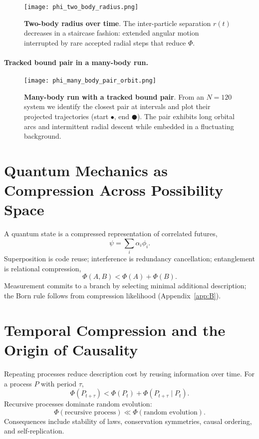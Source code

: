 \documentclass[aps,preprint,onecolumn,longbibliography,nofootinbib]{revtex4-2}
\numberwithin{equation}{section}        %
\begin{document}
\begin{figure}[H]
\centering
\texttt{[image: phi\_two\_body\_radius.png]}
\caption{\textbf{Two-body radius over time}. The inter-particle separation $r(t)$ decreases in a staircase fashion: extended angular motion interrupted by rare accepted radial steps that reduce $\Phi$.}
\label{fig:tworadius}
\end{figure}

\paragraph*{Tracked bound pair in a many-body run.}
\begin{figure}[H]
\centering
\texttt{[image: phi\_many\_body\_pair\_orbit.png]}
\caption{\textbf{Many-body run with a tracked bound pair}. From an $N{=}120$ system we identify the closest pair at intervals and plot their projected trajectories (start $\bullet$, end $\CIRCLE$). The pair exhibits long orbital arcs and intermittent radial descent while embedded in a fluctuating background.}
\label{fig:manypair}
\end{figure}

\section{Quantum Mechanics as Compression Across Possibility Space}
A quantum state is a compressed representation of correlated futures,
\begin{equation}
\psi = \sum_i \alpha_i \phi_i. \label{eq:super}
\end{equation}
Superposition is code reuse; interference is redundancy cancellation; entanglement is relational compression,
\begin{equation}
\Phi(A,B) < \Phi(A)+\Phi(B). \label{eq:ent}
\end{equation}
Measurement commits to a branch by selecting minimal additional description; the Born rule follows from compression likelihood (Appendix~\ref{app:B}).

\section{Temporal Compression and the Origin of Causality}
Repeating processes reduce description cost by reusing information over time. For a process $P$ with period $\tau$,
\begin{equation}
\Phi(P_{t+\tau}) < \Phi(P_t) + \Phi(P_{t+\tau}\mid P_t). \label{eq:loop}
\end{equation}
Recursive processes dominate random evolution:
\begin{equation}
\Phi(\text{recursive process}) \ll \Phi(\text{random evolution}). \label{eq:recur}
\end{equation}
Consequences include stability of laws, conservation symmetries, causal ordering, and self-replication.
\end{document}

